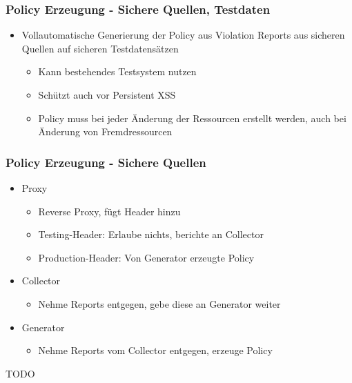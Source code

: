 \documentclass[handout]{beamer}
\begin{document}
\begin{frame}[c]
\frametitle{Policy Erzeugung - Sichere Quellen, Testdaten}
\begin{itemize}
\item Vollautomatische Generierung der Policy aus Violation Reports aus sicheren Quellen auf sicheren Testdatensätzen
\begin{itemize}
\item Kann bestehendes Testsystem nutzen
\item Schützt auch vor Persistent XSS
\item Policy muss bei jeder Änderung der Ressourcen erstellt werden, auch bei Änderung von Fremdressourcen
\end{itemize}
\end{itemize}
\end{frame}

\begin{frame}[c]
\frametitle{Policy Erzeugung - Sichere Quellen}
\begin{itemize}
\item Proxy
\begin{itemize}
\item Reverse Proxy, fügt Header hinzu
\item Testing-Header: Erlaube nichts, berichte an Collector
\item Production-Header: Von Generator erzeugte Policy
\end{itemize}
\item Collector
\begin{itemize}
\item Nehme Reports entgegen, gebe diese an Generator weiter
\end{itemize}
\item Generator
\begin{itemize}
\item Nehme Reports vom Collector entgegen, erzeuge Policy
\end{itemize}
\end{itemize}
\end{frame}

\begin{frame}[c]
\end{frame}

\begin{thebibliography}{}
TODO
\end{thebibliography}
\end{document}
